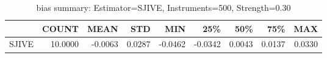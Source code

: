 \begin{table}[ht]
\centering
\caption{bias summary: Estimator=SJIVE, Instruments=500, Strength=0.30}
\begin{tabular}{lrrrrrrrr}
\toprule
 & COUNT & MEAN & STD & MIN & 25\% & 50\% & 75\% & MAX \\
\midrule
SJIVE & 10.0000 & -0.0063 & 0.0287 & -0.0462 & -0.0342 & 0.0043 & 0.0137 & 0.0330 \\
\bottomrule
\end{tabular}
\end{table}
